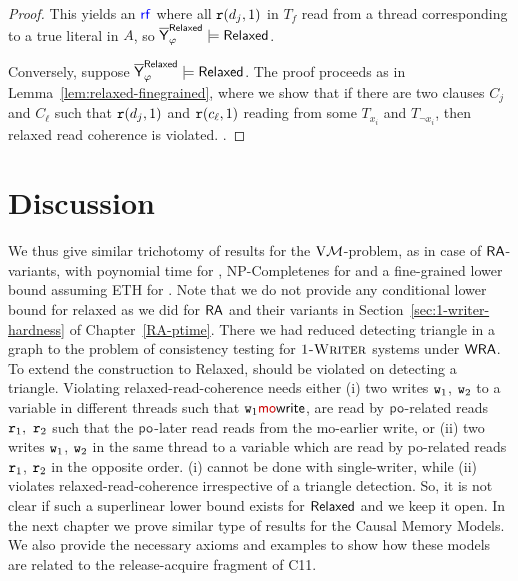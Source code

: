 \begin{proof}
    This yields an $\rf$ where all $\mathtt{r}(d_j, 1)$ in $T_f$ read from a thread corresponding to a true literal in $A$, so $\overline{\mathsf{\color{black}Y}}_\varphi^{\mathsf{Relaxed}} \models \mathsf{Relaxed}$.

    
    
    Conversely, suppose $\overline{\mathsf{\color{black}Y}}_\varphi^{\mathsf{Relaxed}} \models \mathsf{Relaxed}$. 
    The proof proceeds as in Lemma~\ref{lem:relaxed-finegrained}, where we show that if there are two clauses $C_j$ and $C_{\ell}$ such that $\mathtt{r}(d_j, 1)$ and $\mathtt{r}(c_\ell, 1)$ reading from some $T_{x_i}$ and $T_{\neg x_i}$, then relaxed read coherence is violated. .
\end{proof}


\section{Discussion}
We thus give similar trichotomy of results for the $\mathrm{V}\mathcal{M}$-problem, as in case of $\mathsf{RA}$-variants, with poynomial time for \onewriter{}, NP-Completenes for \twowriter{} and a fine-grained lower bound assuming ETH for \threewriter{}.  Note that we do not provide any conditional lower bound for relaxed as we did for $\mathsf{RA}$ and their variants in Section~\ref{sec:1-writer-hardness} of Chapter~\ref{RA-ptime}. There we had reduced detecting triangle in a graph to the problem of consistency testing for $\textsc{1-Writer}$ systems under $\mathsf{WRA}$.  
To extend the construction to  Relaxed, \RlxRCoh should be violated on detecting a triangle. Violating relaxed-read-coherence needs either (i) two writes $\mathtt{w}_1$, $\mathtt{w}_2$ to a variable in different threads such that $\wt_1\mo\w$, are read by $\po$-related reads $\mathtt{r}_1,~ \mathtt{r}_2$ such that the $\po$-later
read reads from the mo-earlier write, or (ii) two writes $\mathtt{w}_1$, $\mathtt{w}_2$ in the same thread to a variable which
are read by po-related reads $\mathtt{r}_1$, $\mathtt{r}_2$ in the opposite order. (i) cannot be done with single-writer, while
(ii) violates relaxed-read-coherence irrespective of a triangle detection. So, it is not clear if such a superlinear lower bound exists for $\mathsf{Relaxed}$ and we keep it open. In the next chapter we prove similar type of results for the Causal Memory Models. We also provide the necessary axioms and examples to show how these models are related to the release-acquire fragment of C11. 




